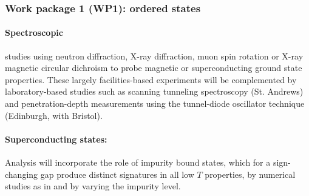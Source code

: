 \subsubsection*{Work package 1 (WP1): ordered states}
\noindent
\paragraph{Spectroscopic} studies using neutron diffraction, X-ray diffraction, muon spin rotation or X-ray magnetic circular dichroism to probe magnetic or superconducting ground state properties. These largely facilities-based experiments will be complemented by laboratory-based studies such as scanning tunneling spectroscopy (St. Andrews) and penetration-depth measurements using the tunnel-diode oscillator technique (Edinburgh, with Bristol).

\paragraph{Superconducting states:}
Analysis will incorporate the role of impurity bound states, which for a sign-changing gap produce distinct signatures in  all low $T$ properties, by numerical studies as in \cite{bang17} and by varying the impurity level.

